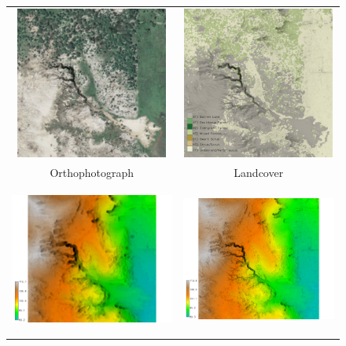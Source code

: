 \begin{figure}[h]
\small\sf\centering
{}
\begin{tabular}{m{} m{}}
%
\multicolumn{1}{c}{\includegraphics[height=50mm]{../images/sample_data/naip_2014.png}} &
\multicolumn{1}{c}{\includegraphics[height=50mm]{../images/sample_data/landcover.png}}\\
\multicolumn{1}{c}{Orthophotograph} & \multicolumn{1}{c}{Landcover}\\
%
\multicolumn{1}{c}{\includegraphics[height=50mm]{../images/sample_data/elevation_2004.png}} &
\multicolumn{1}{c}{\includegraphics[height=50mm]{../images/sample_data/elevation_2016.png}}\\

\end{tabular}
\end{figure}
